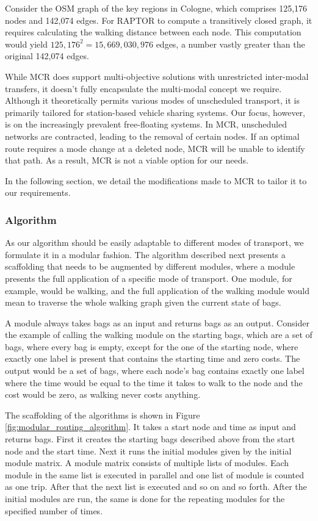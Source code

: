 Consider the OSM graph of the key regions in Cologne, which comprises 125,176 nodes and 142,074 edges.
For RAPTOR to compute a transitively closed graph, it requires calculating the walking distance between each node.
This computation would yield \(125,176^2 = 15,669,030,976\) edges, a number vastly greater than the original 142,074 edges.

While MCR does support multi-objective solutions with unrestricted inter-modal transfers, it doesn't fully encapsulate the multi-modal concept we require.
Although it theoretically permits various modes of unscheduled transport, it is primarily tailored for station-based vehicle sharing systems.
Our focus, however, is on the increasingly prevalent free-floating systems.
In MCR, unscheduled networks are contracted, leading to the removal of certain nodes.
If an optimal route requires a mode change at a deleted node, MCR will be unable to identify that path.
As a result, MCR is not a viable option for our needs.


In the following section, we detail the modifications made to MCR to tailor it to our requirements.

\subsubsection{Algorithm}
\label{subsubsec:algorithm}

As our algorithm should be easily adaptable to different modes of transport, we formulate it in a modular fashion.
The algorithm described next presents a scaffolding that needs to be augmented by different modules, where a module presents the full application of a specific mode of transport.
One module, for example, would be walking, and the full application of the walking module would mean to traverse the whole walking graph given the current state of bags.

A module always takes bags as an input and returns bags as an output.
Consider the example of calling the walking module on the starting bags, which are a set of bags, where every bag is empty, except for the one of the starting node, where exactly one label is present that contains the starting time and zero costs.
The output would be a set of bags, where each node's bag contains exactly one label where the time would be equal to the time it takes to walk to the node and the cost would be zero, as walking never costs anything.

The scaffolding of the algorithms is shown in Figure \ref{fig:modular_routing_algorithm}.
It takes a start node and time as input and returns bags.
First it creates the starting bags described above from the start node and the start time.
Next it runs the initial modules given by the initial module matrix.
A module matrix consists of multiple lists of modules.
Each module in the same list is executed in parallel and one list of module is counted as one trip.
After that the next list is executed and so on and so forth.
After the initial modules are run, the same is done for the repeating modules for the specified number of times.

